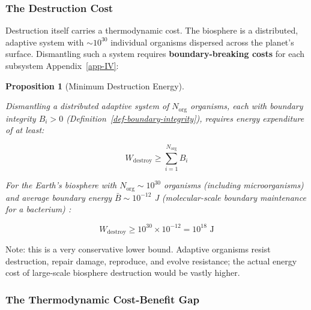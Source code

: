 \documentclass[11pt]{article}
\theoremstyle{plain}
\newtheorem{proposition}[theorem]{Proposition}
\theoremstyle{definition}
\theoremstyle{remark}
\let\origsubsubsection\subsubsection
\renewcommand{\subsubsection}{\needspace{4\baselineskip}\origsubsubsection}
\begin{document}
\subsubsection{The Destruction Cost}\label{the-destruction-cost}

Destruction itself carries a thermodynamic cost. The biosphere is a
distributed, adaptive system with \(\sim 10^{30}\) individual organisms
dispersed across the planet's surface. Dismantling such a system
requires \textbf{boundary-breaking costs} for each subsystem
Appendix~\ref{app-IV}:

\begin{proposition}[Minimum Destruction Energy]
\label{prop-minimum-destruction-energy}

Dismantling a distributed adaptive system of $N_{\text{org}}$ organisms, each with boundary integrity $B_i > 0$ (Definition~\ref{def-boundary-integrity}), requires energy expenditure of at least:

$$W_{\text{destroy}} \geq \sum_{i=1}^{N_{\text{org}}} B_i$$

For the Earth's biosphere with $N_{\text{org}} \sim 10^{30}$ organisms (including microorganisms) \citep{Whitman1998} and average boundary energy $\bar{B} \sim 10^{-12}$ J (molecular-scale boundary maintenance for a bacterium) \citep{Milo2015}:

$$W_{\text{destroy}} \geq 10^{30} \times 10^{-12} = 10^{18} \text{ J}$$
\end{proposition}

Note: this is a very conservative lower bound. Adaptive organisms resist
destruction, repair damage, reproduce, and evolve resistance; the actual
energy cost of large-scale biosphere destruction would be vastly higher.

\subsubsection{The Thermodynamic Cost-Benefit
Gap}\label{the-thermodynamic-cost-benefit-gap}
\end{document}
